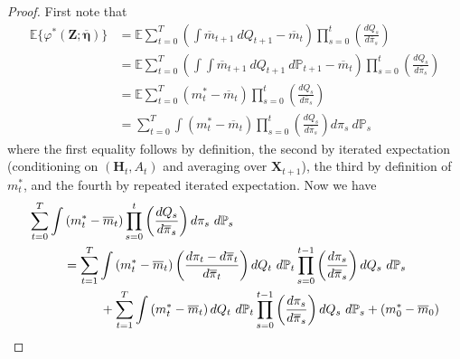 \documentclass[12pt]{article}
\newcommand{\Pb}{\mathbb{P}}
\newcommand{\E}{\mathbb{E}}
\newcommand{\bZ}{\mathbf{Z}}
\newcommand{\bX}{\mathbf{X}}
\newcommand{\bH}{\mathbf{H}}
\theoremstyle{remark}
\begin{document}
\begin{proof}
First note that
\begin{align*}
\E\{\varphi^*(\bZ;\boldsymbol{\overline\eta})\} &= \E \sum_{t=0}^T \left( \int \overline{m}_{t+1} \ dQ_{t+1} - \overline{m}_t \right) \prod_{s=0}^t \left( \frac{dQ_s}{d\overline\pi_s} \right) \\
&= \E \sum_{t=0}^T  \left( \int \int \overline{m}_{t+1} \ dQ_{t+1} \ d\Pb_{t+1} - \overline{m}_t \right)  \prod_{s=0}^t  \left( \frac{dQ_s}{d\overline\pi_s} \right) \\
&= \E \sum_{t=0}^T  \left( m_t^* - \overline{m}_t \right)  \prod_{s=0}^t  \left( \frac{dQ_s}{d\overline\pi_s} \right) \\
&= \sum_{t=0}^T \int \left( m_t^* - \overline{m}_t \right)  \prod_{s=0}^t  \left( \frac{dQ_s}{d\overline\pi_s} \right) d\pi_s \ d\Pb_s
\end{align*}
where the first equality follows by definition, the second by iterated expectation (conditioning on $(\bH_t,A_t)$ and averaging over $\bX_{t+1}$), the third by definition of $m_t^*$, and the fourth by repeated iterated expectation. Now we have
\begin{align*}
\sum_{t=0}^T \int &\left( m_t^* - \overline{m}_t \right)  \prod_{s=0}^t  \left( \frac{dQ_s}{d\overline\pi_s} \right) d\pi_s \ d\Pb_s \\
&= \sum_{t=1}^T \int \left( m_t^* - \overline{m}_t \right)  \left( \frac{d\pi_t-d\overline\pi_t}{d\overline\pi_t} \right) dQ_t \ d\Pb_t  \prod_{s=0}^{t-1}  \left( \frac{d\pi_s}{d\overline\pi_s} \right) dQ_s  \ d\Pb_s \\
& \hspace{.4in} + \sum_{t=1}^T \int \left( m_t^* - \overline{m}_t \right) dQ_t \ d\Pb_t  \prod_{s=0}^{t-1}  \left( \frac{d\pi_s}{d\overline\pi_s} \right) dQ_s  \ d\Pb_s + (m_0^* - \overline{m}_0) \\

\end{align*}
\end{proof}
\end{document}
